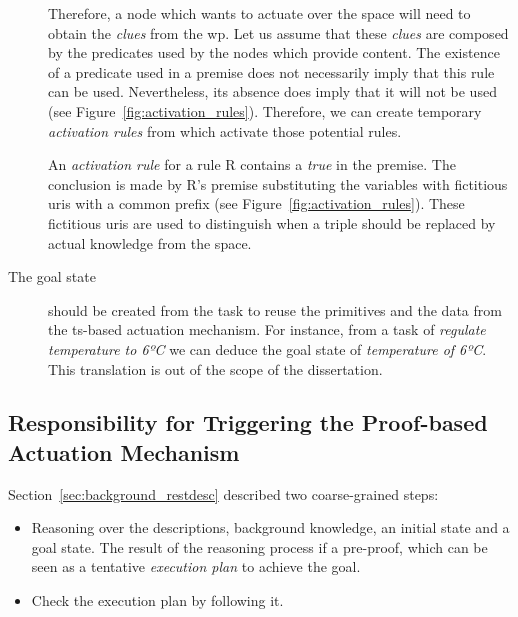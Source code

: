 \begin{description}
	Therefore, a node which wants to actuate over the space will need to obtain the \emph{clues} from the \ac{wp}.
	Let us assume that these \emph{clues} are composed by the predicates used by the nodes which provide content. %
	The existence of a predicate used in a premise does not necessarily imply that this rule can be used.
	Nevertheless, its absence does imply that it will not be used (see Figure~\ref{fig:activation_rules}).
	Therefore, we can create temporary \emph{activation rules} from \clues{} which activate those potential rules. %


	An \emph{activation rule} for a rule R contains a \emph{true} in the premise.
	The conclusion is made by R's premise substituting the variables with fictitious \acsp{uri} with a common prefix (see Figure~\ref{fig:activation_rules}).
	These fictitious \acsp{uri} are used to distinguish when a triple should be replaced by actual knowledge from the space. %


  \item[The goal state] should be created from the task to reuse the primitives and the data from the \ac{ts}-based actuation mechanism.
	For instance, from a task of \emph{regulate temperature to 6ºC} we can deduce the goal state of \emph{temperature of 6ºC}.
	This translation is out of the scope of the dissertation.
\end{description}


\subsection{Responsibility for Triggering the Proof-based Actuation Mechanism}
\label{sec:responsible_proof}

Section~\ref{sec:background_restdesc} described two coarse-grained steps:
\begin{itemize}
  \item Reasoning over the descriptions, background knowledge, an initial state and a goal state.
        The result of the reasoning process if a pre-proof, which can be seen as a tentative \emph{execution plan} to achieve the goal.
  \item Check the execution plan by following it.
\end{itemize}


